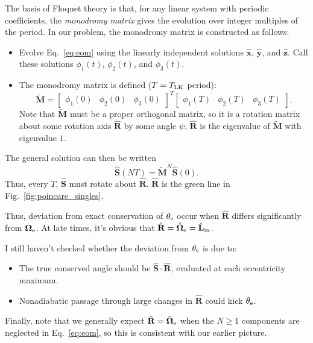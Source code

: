 \documentclass[11pt,
        usenames, %
        dvipsnames %
    ]{article}
\newcommand*{\bm}[1]{\boldsymbol{\mathbf{#1}}}
\newcommand*{\uv}[1]{\hat{\bm{#1}}}
\begin{document}
The basis of Floquet theory is that, for any linear system with periodic
coefficients, the \emph{monodromy matrix} gives the evolution over integer
multiples of the period. In our problem, the monodromy matrix is constructed as
follows:
\begin{itemize}
    \item Evolve Eq.~\eqref{eq:eom} using the linearly independent solutions
        $\uv{x}$, $\uv{y}$, and $\uv{z}$. Call these solutions $\phi_1(t)$, $
        \phi_2(t)$, and $\phi_3(t)$.

    \item The monodromy matrix is defined ($T = T_{\rm LK}$ period):
        \begin{equation}
            \bm{\tilde{M}} = \begin{bmatrix}
                \phi_1(0) & \phi_2(0) & \phi_3(0)
            \end{bmatrix}^T \begin{bmatrix}
                \phi_1(T) & \phi_2(T) & \phi_3(T)
            \end{bmatrix}.
        \end{equation}
        Note that $\bm{\tilde{M}}$ must be a proper orthogonal matrix, so it is
        a rotation matrix about some rotation axis $\uv{R}$ by some angle
        $\psi$. $\uv{R}$ is the eigenvalue of $\bm{\tilde{M}}$ with eigenvalue
        $1$.
\end{itemize}
The general solution can then be written
\begin{equation}
    \uv{S}(NT) = \bm{\tilde{M}}^N \uv{S}(0).
\end{equation}
Thus, every $T$, $\uv{S}$ must rotate about $\uv{R}$. $\uv{R}$ is the green line
in Fig.~\ref{fig:poincare_singles}.

Thus, deviation from exact conservation of $\theta_{\rm e}$ occur when $\uv{R}$
differs significantly from $\bm{\Omega}_{\rm e}$. At late times, it's obvious
that $\uv{R} = \uv{\Omega}_{\rm e} = \uv{L}_{\rm in}$.

I still haven't checked whether the deviation from $\theta_{\rm e}$ is due to:
\begin{itemize}
    \item The true conserved angle should be $\uv{S} \cdot \uv{R}$, evaluated at
        each eccentricity maximum.

    \item Nonadiabatic passage through large changes in $\uv{R}$ could kick
        $\theta_{\rm e}$.
\end{itemize}

Finally, note that we generally expect $\uv{R} = \uv{\Omega}_{\rm e}$ when the
$N \geq 1$ components are neglected in Eq.~\eqref{eq:eom}, so this is consistent
with our earlier picture.
\end{document}
